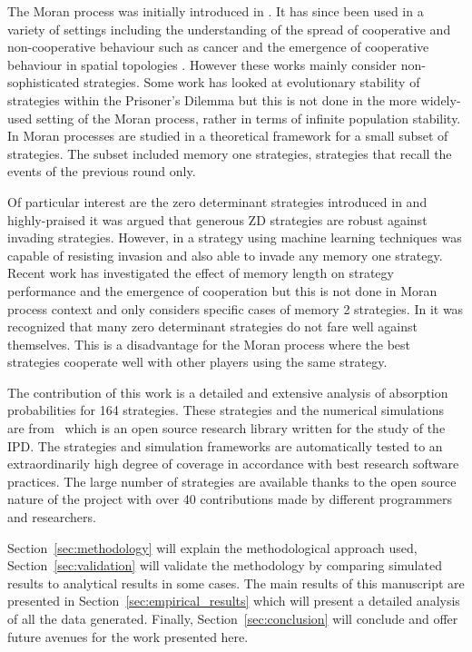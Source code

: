 \documentclass{article}
\begin{document}
The Moran process was initially introduced in \cite{Moran1957}. It has since
been used in a variety of settings including the understanding of the spread of
cooperative and non-cooperative behaviour such as cancer \cite{West2016} and the
emergence of cooperative behaviour in spatial topologies \cite{Nowak2017}.
However these works mainly consider non-sophisticated strategies. Some work has
looked at evolutionary stability of strategies within the Prisoner's Dilemma
\cite{Li2014} but this is not done in the more widely-used setting of the Moran
process, rather in terms of infinite population stability. In \cite{Baek2016}
Moran processes are studied in a theoretical framework for a small subset of
strategies.  The subset included memory one strategies, strategies that recall
the events of the previous round only.

Of particular interest are the zero determinant strategies introduced in
\cite{Press2012} and highly-praised \cite{Stewart2012} it was argued that
generous ZD strategies are robust against invading strategies. However, in
\cite{Lee2015} a strategy using machine learning techniques was capable of
resisting invasion and also able to invade any memory one strategy.  Recent work
\cite{Hilbe2017} has investigated the effect of memory length on strategy
performance and the emergence of cooperation but this is not done in Moran
process context and only considers specific cases of memory 2 strategies.  In
\cite{Adami2013} it was recognized that many zero determinant strategies do not
fare well against themselves. This is a disadvantage for the Moran process where
the best strategies cooperate well with other players using the same strategy.

The contribution of this work is a detailed and extensive analysis of absorption
probabilities for 164 strategies. These strategies and the numerical simulations
are from~\cite{axelrodproject} which is an open source research library written
for the study of the IPD\@. The strategies and simulation frameworks are
automatically tested to an extraordinarily high degree of coverage in accordance
with best research software practices. The large
number of strategies are available thanks to the open source nature of the
project with over 40 contributions made by different programmers and researchers.

Section~\ref{sec:methodology} will explain the methodological approach used,
Section~\ref{sec:validation} will validate the methodology by comparing
simulated results to analytical results in some cases. The main results of this
manuscript are presented in Section~\ref{sec:empirical_results} which will
present a detailed analysis of all the data generated. Finally,
Section~\ref{sec:conclusion} will conclude and offer future avenues for the work
presented here.
\end{document}
